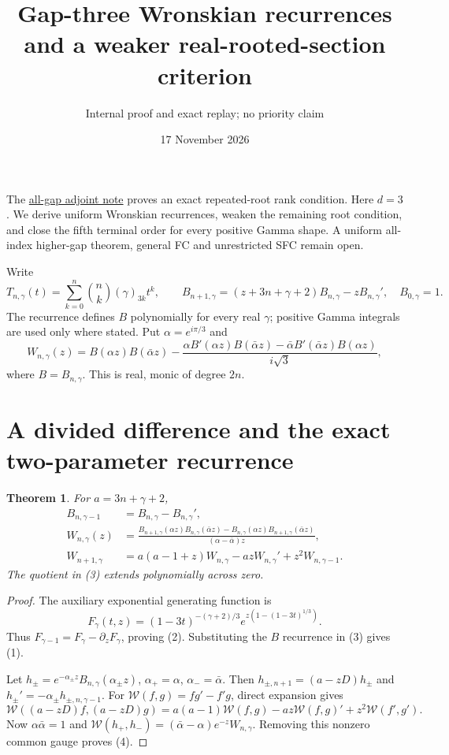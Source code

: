 \documentclass[11pt]{article}
\title{Gap-three Wronskian recurrences and a weaker real-rooted-section criterion}
\author{Internal proof and exact replay; no priority claim}
\date{17 November 2026}
\newtheorem{theorem}{Theorem}
\begin{document}
\maketitle
The \href{HIGHER_GAP_ADJOINT_RANK.tex}{all-gap adjoint note} proves
an exact repeated-root rank condition. Here $d=3$. We derive uniform
Wronskian recurrences, weaken the remaining root condition, and close
the fifth terminal order for every positive Gamma shape. A uniform
all-index higher-gap theorem, general FC and unrestricted SFC remain open.

Write
\[
 T_{n,\gamma}(t)=\sum_{k=0}^n\binom nk(\gamma)_{3k}t^k,\qquad
 B_{n+1,\gamma}=(z+3n+\gamma+2)B_{n,\gamma}-zB_{n,\gamma}',
 \quad B_{0,\gamma}=1.
\]
The recurrence defines $B$ polynomially for every real $\gamma$;
positive Gamma integrals are used only where stated.
Put $\alpha=e^{i\pi/3}$ and
\[
 W_{n,\gamma}(z)=B(\alpha z)B(\bar\alpha z)-
 \frac{\alpha B'(\alpha z)B(\bar\alpha z)
       -\bar\alpha B'(\bar\alpha z)B(\alpha z)}{i\sqrt3},       \tag{1}
\]
where $B=B_{n,\gamma}$. This is real, monic of degree $2n$.

\section{A divided difference and the exact two-parameter recurrence}
\begin{theorem}\label{thm:rec}
For $a=3n+\gamma+2$,
\begin{align}
 B_{n,\gamma-1}&=B_{n,\gamma}-B_{n,\gamma}',                   \tag{2}\\
 W_{n,\gamma}(z)&=
 \frac{B_{n+1,\gamma}(\alpha z)B_{n,\gamma}(\bar\alpha z)
       -B_{n,\gamma}(\alpha z)B_{n+1,\gamma}(\bar\alpha z)}
      {(\alpha-\bar\alpha)z},                               \tag{3}\\
 W_{n+1,\gamma}&=a(a-1+z)W_{n,\gamma}-azW_{n,\gamma}'
                                      +z^2W_{n,\gamma-1}.     \tag{4}
\end{align}
The quotient in (3) extends polynomially across zero.
\end{theorem}
\begin{proof}
The auxiliary exponential generating function is
\[
 F_\gamma(t,z)=(1-3t)^{-(\gamma+2)/3}
                  e^{z(1-(1-3t)^{1/3})}.
\]
Thus $F_{\gamma-1}=F_\gamma-\partial_z F_\gamma$, proving (2).
Substituting the $B$ recurrence in (3) gives (1).

Let $h_\pm=e^{-\alpha_\pm z}B_{n,\gamma}(\alpha_\pm z)$,
$\alpha_+=\alpha$, $\alpha_-=\bar\alpha$.
Then $h_{\pm,n+1}=(a-zD)h_\pm$ and
$h_\pm'=-\alpha_\pm h_{\pm,n,\gamma-1}$.
For $\mathcal W(f,g)=fg'-f'g$, direct expansion gives
\[
 \mathcal W((a-zD)f,(a-zD)g)
 =a(a-1)\mathcal W(f,g)-az\mathcal W(f,g)'
                                    +z^2\mathcal W(f',g').
\]
Now $\alpha\bar\alpha=1$ and
$\mathcal W(h_+,h_-)=(\bar\alpha-\alpha)e^{-z}W_{n,\gamma}$.
Removing this nonzero common gauge proves (4).
\end{proof}
\end{document}
